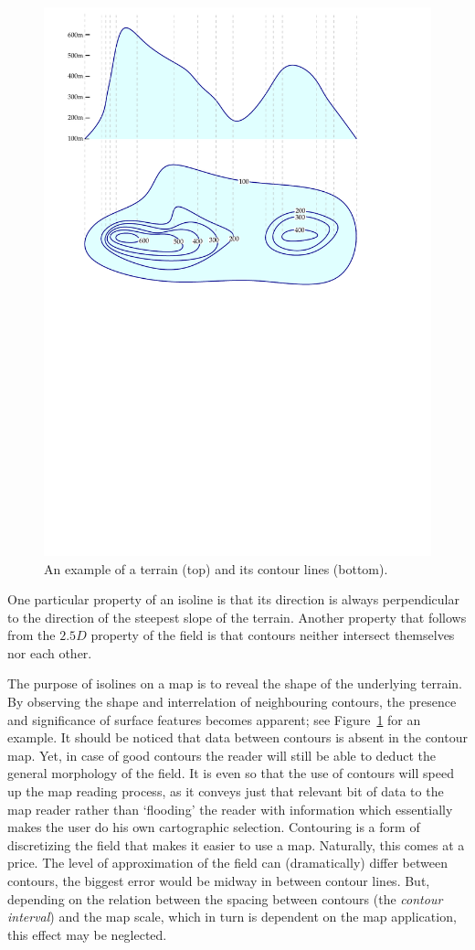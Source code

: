\begin{figure}
  \includegraphics[width=0.7\linewidth]{figs/contours.pdf}
  \caption{An example of a terrain (top) and its contour lines (bottom).}%
  \label{fig:contours}
\end{figure}

One particular property of an isoline is that its direction is always perpendicular to the direction of the steepest slope of the terrain. 
Another property that follows from the $2.5D$ property of the field is that contours neither intersect themselves nor each other.

%

The purpose of isolines on a map is to reveal the shape of the underlying terrain. 
By observing the shape and interrelation of neighbouring contours, the presence and significance of surface features becomes apparent; see Figure~\ref{fig:contours} for an example.
It should be noticed that data between contours is absent in the contour map. 
Yet, in case of good contours the reader will still be able to deduct the general morphology of the field. 
It is even so that the use of contours will speed up the map reading process, as it conveys just that relevant bit of data to the map reader rather than `flooding' the reader with information which essentially makes the user do his own cartographic selection. 
Contouring is a form of discretizing the field that makes it easier to use a map. 
Naturally, this comes at a price. 
The level of approximation of the field can (dramatically) differ between contours, the biggest error would be midway in between contour lines. 
But, depending on the relation between the spacing between contours (the \emph{contour interval}) and the map scale, which in turn is dependent on the map application, this effect may be neglected.


